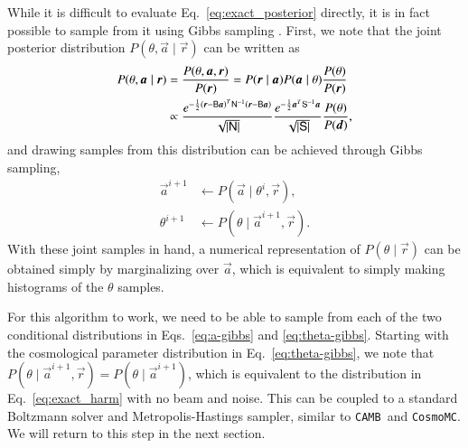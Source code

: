 \documentclass[twocolumn]{../common/aa}
\def\cosmomc{\texttt{CosmoMC}}
\def\camb{\texttt{CAMB}}
\renewcommand{\d}[0]{\vec{d}}
\newcommand{\B}[0]{\tens{B}}
\renewcommand{\a}[0]{\vec{a}}
\newcommand{\N}[0]{\tens{N}}
\renewcommand{\S}[0]{\tens{S}}
\renewcommand{\r}[0]{\vec{r}}
\begin{document}
While it is difficult to evaluate Eq.~\eqref{eq:exact_posterior} directly, it is in fact possible to sample from it using Gibbs sampling \citep{jewell2004,wandelt2004}. First, we note that the joint posterior distribution $P(\theta, \a \mid \r)$ can be written as
\begin{align}
    \nonumber
    P(\theta, \a \mid \r) &= \frac{P(\theta, \a, \r)}{P(\r)} = P(\r \mid \a)P(\a\mid \theta)\frac{P(\theta)}{P(\r)}\\
    \label{eq:joint-posterior}
    &\propto \frac{e^{-\frac12 \left(\r-\B\a \right)^T \N^{-1}\left(\r-\B\a \right)}}{\sqrt{\left|\N\right|}}
    \frac{e^{-\frac12 \a^T \S^{-1}\a}}{\sqrt{\left|\S\right|}}\frac{P(\theta)}{P(\d)},
\end{align}
and drawing samples from this distribution can be achieved through Gibbs sampling,
\begin{align}
    \label{eq:a-gibbs}
    \a^{i+1} &\leftarrow P(\a \mid \theta^{i}, \r),\\
    \label{eq:theta-gibbs}
    \theta^{i+1} &\leftarrow P(\theta \mid \a^{i+1}, \r).
\end{align}
With these joint samples in hand, a numerical representation of $P(\theta \mid \r)$ can be obtained simply by marginalizing over $\a$, which is equivalent to simply making histograms of the $\theta$ samples.

For this algorithm to work, we need to be able to sample from each of the two conditional distributions in Eqs.~\eqref{eq:a-gibbs} and \eqref{eq:theta-gibbs}. Starting with the cosmological parameter distribution in Eq.~\eqref{eq:theta-gibbs}, we note that $P(\theta \mid \a^{i+1}, \r) = P(\theta \mid \a^{i+1})$, which is equivalent to the distribution in Eq.~\eqref{eq:exact_harm} with no beam and noise. This can be coupled to a standard Boltzmann solver and Metropolis-Hastings sampler, similar to \camb\ and \cosmomc. We will return to this step in the next section.
\end{document}
